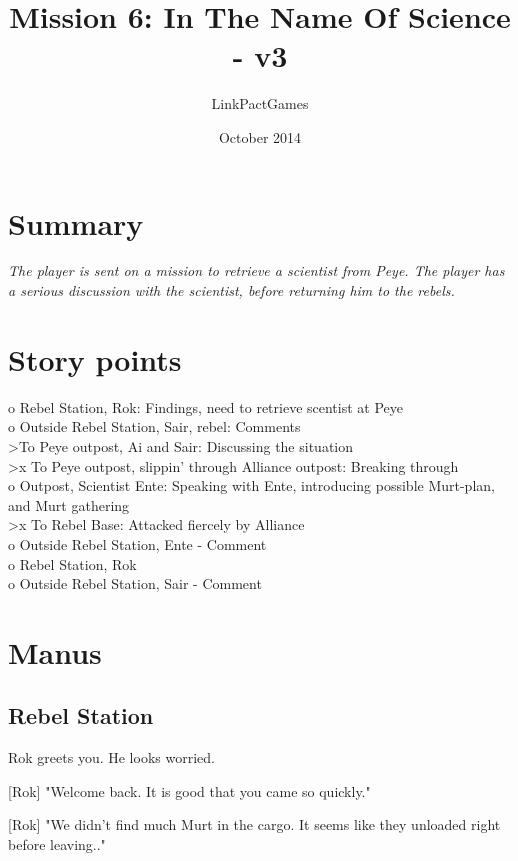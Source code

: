 \documentclass[a4paper,12pt]{article}
\begin{document}
\title{Mission 6: In The Name Of Science - v3}
\author{LinkPactGames}
\date{October 2014}
\maketitle

\section{Summary}

\textit{The player is sent on a mission to retrieve a scientist from Peye.
The player has a serious discussion with the scientist, before returning him
to the rebels.}

\section{Story points}

o Rebel Station, Rok: Findings, need to retrieve scentist at Peye\\
o Outside Rebel Station, Sair, rebel: Comments\\
\textgreater To Peye outpost, Ai and Sair: Discussing the situation\\
\textgreater x To Peye outpost, slippin' through Alliance outpost: Breaking through\\
o Outpost, Scientist Ente: Speaking with Ente, introducing possible Murt-plan, and Murt
gathering\\
\textgreater x To Rebel Base: Attacked fiercely by Alliance\\
o Outside Rebel Station, Ente - Comment\\
o Rebel Station, Rok\\
o Outside Rebel Station, Sair - Comment

\section{Manus}

\subsection{Rebel Station}

Rok greets you. He looks worried. 

[Rok] "Welcome back. It is good that you came so quickly."

[Rok] "We didn't find much Murt in the cargo. It seems like they unloaded right before leaving.."
\end{document}
